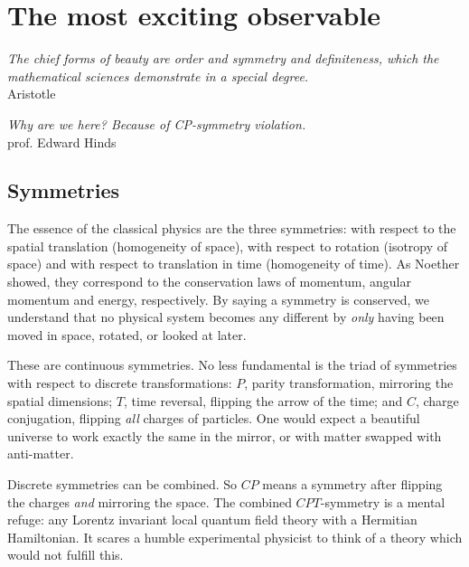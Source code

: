 \chapter{The most exciting observable}
\label{ch:nedm-at-psi}

\begin{center}
  \emph{The chief forms of beauty are order and symmetry and definiteness, which the mathematical sciences demonstrate in a special degree.}\\
  Aristotle
\end{center}


\begin{center}
  \emph{Why are we here? Because of CP-symmetry violation.}\\
  prof. Edward Hinds
\end{center}

\section{Symmetries}


The essence of the classical physics are the three symmetries: with respect to the spatial translation (homogeneity of space), with respect to rotation (isotropy of space) and with respect to translation in time (homogeneity of time). As Noether showed, they correspond to the conservation laws of momentum, angular momentum and energy, respectively. By saying a symmetry is conserved, we understand that no physical system becomes any different by \emph{only} having been moved in space, rotated, or looked at later.

These are continuous symmetries. No less fundamental is the triad of symmetries with respect to discrete transformations: $P$, parity transformation, mirroring the spatial dimensions; $T$, time reversal, flipping the arrow of the time; and $C$, charge conjugation, flipping \emph{all} charges of particles. One would expect a beautiful universe to work exactly the same in the mirror, or with matter swapped with anti-matter.

Discrete symmetries can be combined. So $CP$ means a symmetry after flipping the charges \emph{and} mirroring the space. The combined $CPT$-symmetry is a mental refuge: any Lorentz invariant local quantum field theory with a Hermitian Hamiltonian. It scares a humble experimental physicist to think of a theory which would not fulfill this.


